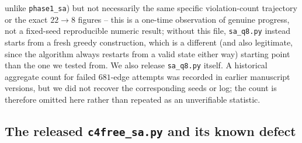 \documentclass[12pt,a4paper]{article}
\theoremstyle{definition}
\begin{document}
unlike \texttt{phase1\_sa}) but not necessarily the same specific
violation-count trajectory or the exact $22\to8$ figures -- this is a
one-time observation of genuine progress, not a fixed-seed
reproducible numeric result;
without this file, \texttt{sa\_q8.py} instead
starts from a fresh greedy construction, which is a different (and
also legitimate, since the algorithm always restarts from a valid
state either way) starting point than the one we tested from. We
also release \texttt{sa\_q8.py} itself. A historical aggregate count for
failed $681$-edge attempts was recorded in earlier manuscript versions, but
we did not recover the corresponding seeds or log; the count is therefore
omitted here rather than repeated as an unverifiable statistic.

\subsection{The released \texttt{c4free\_sa.py} and its known defect}\label{sec:c4freesa}
\end{document}
